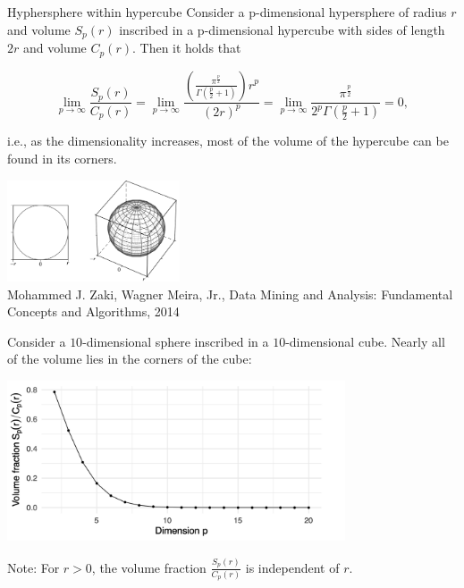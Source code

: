 \begin{vbframe}{Hyphersphere within hypercube}
Consider a p-dimensional hypersphere of radius $r$ and volume $S_p(r)$ inscribed in a p-dimensional hypercube with sides of length $2r$ and volume $C_p(r)$. Then it holds that
\begin{footnotesize}
$$\lim_{p\rightarrow \infty} \frac{S_p(r)}{C_p(r)} = \lim_{p\rightarrow \infty}
\frac{\left( \frac{\pi^{\frac{p}{2}}}{\Gamma(\frac{p}{2}+1)} \right)r^p}{(2r)^p} =
 \lim_{p\rightarrow \infty} \frac{\pi^{\frac{p}{2}}}{2^p\Gamma(\frac{p}{2}+1)} = 0,$$
\end{footnotesize}
i.e., as the dimensionality increases, most of the volume of the hypercube can be found in its corners.

\begin{center}
\includegraphics[height = 3cm, keepaspectratio]{figure_man/sphere_in_cube.png}\\
\scriptsize{Mohammed J. Zaki, Wagner Meira, Jr., Data Mining and Analysis: Fundamental Concepts and Algorithms, 2014}
\end{center}

\framebreak

Consider a $10$-dimensional sphere inscribed in a $10$-dimensional cube. Nearly all of the volume lies in the corners of the cube:
\medskip

\vspace*{0.1cm}
\begin{center}
\includegraphics[width = 10cm ]{figure_man/vol_dim.png}
\end{center}

\begin{footnotesize}
Note: For $r > 0$, the volume fraction $\frac{S_p(r)}{C_p(r)}$ is independent of
$r$.
\end{footnotesize}

\end{vbframe}

